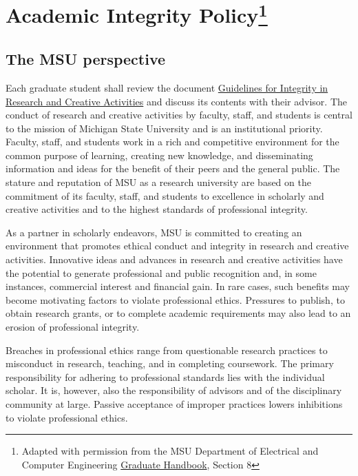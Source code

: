 \section[Academic Integrity Policy]{Academic Integrity
  Policy\footnote{Adapted with permission from the MSU
    Department of Electrical and Computer Engineering
    \href{https://ece.msu.edu/sites/default/files/content/Graduate-Student-Handbook\%20-\%203-26-12\%20_0.pdf}{Graduate
      Handbook}, Section 8}}

\subsection{The MSU perspective}

Each graduate student shall review the document
\href{https://grad.msu.edu/sites/default/files/content/researchintegrity/guidelines.pdf}{Guidelines
  for Integrity in Research and Creative Activities} and discuss its
contents with their advisor.   The conduct of research and creative activities by
faculty, staff, and students is central to the mission of Michigan
State University and is an institutional priority. Faculty, staff, and
students work in a rich and competitive environment for the common
purpose of learning, creating new knowledge, and disseminating
information and ideas for the benefit of their peers and the general
public. The stature and reputation of MSU as a research university are
based on the commitment of its faculty, staff, and students to
excellence in scholarly and creative activities and to the highest
standards of professional integrity.  

As a partner in scholarly endeavors, MSU is committed to creating an
environment that promotes ethical conduct and integrity in research
and creative activities. Innovative ideas and advances in research and
creative activities have the potential to generate professional and
public recognition and, in some instances, commercial interest and
financial gain. In rare cases, such benefits may become motivating
factors to violate professional ethics. Pressures to publish, to
obtain research grants, or to complete academic requirements may also
lead to an erosion of professional integrity.  

Breaches in professional ethics range from questionable research
practices to misconduct in research, teaching, and in completing coursework. The primary responsibility for adhering to
professional standards lies with the individual scholar. It is,
however, also the responsibility of advisors and of the disciplinary
community at large. Passive acceptance of improper practices lowers
inhibitions to violate professional ethics. 

